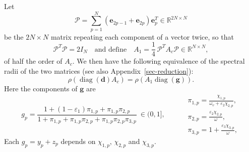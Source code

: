 \documentclass[11pt]{article}
\theoremstyle{plain}
\theoremstyle{definition}
\theoremstyle{remark}
\numberwithin{equation}{section}
\numberwithin{figure}{section}
\numberwithin{table}{section}
\begin{document}
Let
\begin{equation}\label{p-def}
\mathscr{P}=\sum_{p=1}^{N}\left(\bm e_{2p-1}+\bm e_{2p}\right)\bm e_p^T
\in\mathbb{R}^{2N\times N}
\end{equation}
be the $2N\times N$ matrix repeating each component of a vector twice, so that
\begin{equation}\label{p-identities}
\mathscr{P}^T\mathscr{P}=2I_N \quad\mbox{and define}\quad
A_1=\frac{1}{4}\,\mathscr{P}^TA_c\mathscr{P}\in\mathbb{R}^{N\times N},
\end{equation}
of half the order of $A_c$. We then have the following equivalence of the spectral radii of the two matrices (see also Appendix~\ref{sec-reduction}):
\begin{equation}\label{rho-equal}
\rho\left(\operatorname{diag}(\bm d)A_c\right)=\rho\left(A_1\operatorname{diag}(\bm g)\right).
\end{equation}
Here the components of $\bm g$ are
\begin{equation}\label{g-def}
g_p=\frac{1+(1-\varepsilon_1)\pi_{1,p}+\pi_{1,p}\pi_{2,p}}
{1+\pi_{1,p}+\pi_{1,p}\pi_{2,p}+\pi_{1,p}\pi_{2,p}\pi_{3,p}}\ \in(0,1],
\qquad
\begin{aligned}
&\pi_{1,p}=\frac{\chi_{1,p}}{\omega_v+\varepsilon_2\chi_{2,p}},\\
&\pi_{2,p}=\frac{\varepsilon_2\chi_{2,p}}{\omega},\\
&\pi_{3,p}=1+\frac{\varepsilon_3\chi_{3,p}}{\omega},
\end{aligned}
\end{equation}
Each $g_p=y_p+z_p$ depends on $\chi_{1,p}$, $\chi_{2,p}$ and $\chi_{3,p}$.
\end{document}
